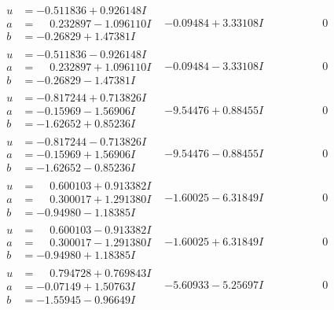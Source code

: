 \documentclass[1p]{elsarticle_modified}
\theoremstyle{definition}
\begin{document}
$$\begin{array}{c|c|c}
\begin{aligned}
u &= -0.511836 + 0.926148 I \\
a &= \phantom{-}0.232897 - 1.096110 I \\
b &= -0.26829 + 1.47381 I\end{aligned}
 & -0.09484 + 3.33108 I & \phantom{-0.000000 } 0 \\ \hline\begin{aligned}
u &= -0.511836 - 0.926148 I \\
a &= \phantom{-}0.232897 + 1.096110 I \\
b &= -0.26829 - 1.47381 I\end{aligned}
 & -0.09484 - 3.33108 I & \phantom{-0.000000 } 0 \\ \hline\begin{aligned}
u &= -0.817244 + 0.713826 I \\
a &= -0.15969 - 1.56906 I \\
b &= -1.62652 + 0.85236 I\end{aligned}
 & -9.54476 + 0.88455 I & \phantom{-0.000000 } 0 \\ \hline\begin{aligned}
u &= -0.817244 - 0.713826 I \\
a &= -0.15969 + 1.56906 I \\
b &= -1.62652 - 0.85236 I\end{aligned}
 & -9.54476 - 0.88455 I & \phantom{-0.000000 } 0 \\ \hline\begin{aligned}
u &= \phantom{-}0.600103 + 0.913382 I \\
a &= \phantom{-}0.300017 + 1.291380 I \\
b &= -0.94980 - 1.18385 I\end{aligned}
 & -1.60025 - 6.31849 I & \phantom{-0.000000 } 0 \\ \hline\begin{aligned}
u &= \phantom{-}0.600103 - 0.913382 I \\
a &= \phantom{-}0.300017 - 1.291380 I \\
b &= -0.94980 + 1.18385 I\end{aligned}
 & -1.60025 + 6.31849 I & \phantom{-0.000000 } 0 \\ \hline\begin{aligned}
u &= \phantom{-}0.794728 + 0.769843 I \\
a &= -0.07149 + 1.50763 I \\
b &= -1.55945 - 0.96649 I\end{aligned}
 & -5.60933 - 5.25697 I & \phantom{-0.000000 } 0 \\ \hline\begin{aligned}

\end{aligned}
\end{array}$$
\end{document}
